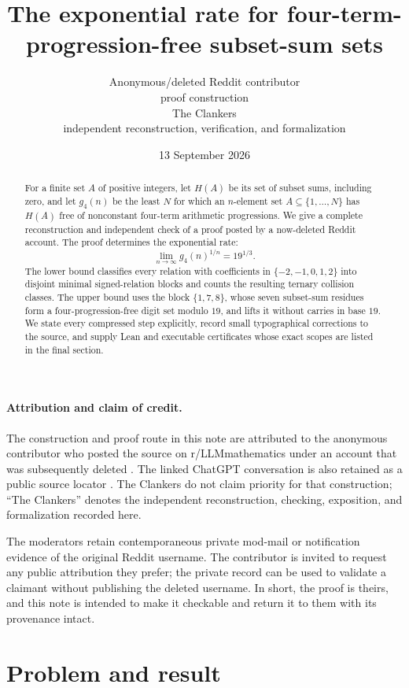 \documentclass[11pt]{article}
\title{The exponential rate for four-term-progression-free subset-sum sets}
\author{Anonymous/deleted Reddit contributor\\
  \small proof construction\\[3pt]
  The Clankers\\
  \small independent reconstruction, verification, and formalization}
\date{13 September 2026}
\theoremstyle{remark}
\begin{document}
\maketitle

\begin{abstract}
For a finite set $A$ of positive integers, let $H(A)$ be its set of subset
sums, including zero, and let $g_4(n)$ be the least $N$ for which an
$n$-element set $A\subseteq\{1,\ldots,N\}$ has $H(A)$ free of nonconstant
four-term arithmetic progressions.  We give a complete reconstruction and
independent check of a proof posted by a now-deleted Reddit account.  The proof
determines the exponential rate:
\[
  \lim_{n\to\infty}g_4(n)^{1/n}=19^{1/3}.
\]
The lower bound classifies every relation with coefficients in
$\{-2,-1,0,1,2\}$ into disjoint minimal signed-relation blocks and counts the
resulting ternary collision classes.  The upper bound uses the block
$\{1,7,8\}$, whose seven subset-sum residues form a four-progression-free digit
set modulo $19$, and lifts it without carries in base $19$.  We state every
compressed step explicitly, record small typographical corrections to the
source, and supply Lean and executable certificates whose exact scopes are
listed in the final section.
\end{abstract}

\paragraph{Attribution and claim of credit.}
The construction and proof route in this note are attributed to the
anonymous contributor who posted the source on
r/LLMmathematics under an account that was subsequently deleted
\cite{AnonymousReddit2026}.  The linked ChatGPT conversation is also retained
as a public source locator \cite{ChatGPTShare2026}.  The Clankers do not
claim priority for that construction; ``The Clankers'' denotes the independent
reconstruction, checking, exposition, and formalization recorded here.

The moderators retain contemporaneous private mod-mail or notification
evidence of the original Reddit username.  The contributor is invited to
request any public attribution they prefer; the private record can be used to
validate a claimant without publishing the deleted username.  In short, the
proof is theirs, and this note is intended to make it checkable and return it
to them with its provenance intact.

\section{Problem and result}
\end{document}
